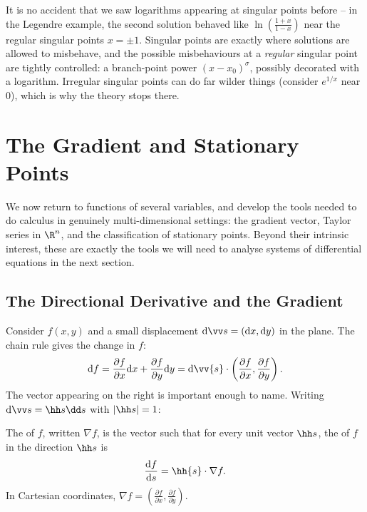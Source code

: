 \begin{remark}
	It is no accident that we saw logarithms appearing at singular points before -- in the Legendre example, the second solution behaved like $\ln\left(\frac{1+x}{1-x}\right)$ near the regular singular points $x = \pm 1$. Singular points are exactly where solutions are allowed to misbehave, and the possible misbehaviours at a \emph{regular} singular point are tightly controlled: a branch-point power $(x - x_0)^\sigma$, possibly decorated with a logarithm. Irregular singular points can do far wilder things (consider $e^{1/x}$ near $0$), which is why the theory stops there.
\end{remark}

\section{The Gradient and Stationary Points}

We now return to functions of several variables, and develop the tools needed to do calculus in genuinely multi-dimensional settings: the gradient vector, Taylor series in $\R^n$, and the classification of stationary points. Beyond their intrinsic interest, these are exactly the tools we will need to analyse systems of differential equations in the next section.

\subsection{The Directional Derivative and the Gradient}

Consider $f(x, y)$ and a small displacement $\mathrm{d}\vv s = (\mathrm{d}x, \mathrm{d}y)$ in the plane. The chain rule gives the change in $f$:
$$
\mathrm{d}f = \frac{\partial f}{\partial x}\mathrm{d}x + \frac{\partial f}{\partial y}\mathrm{d}y = \mathrm{d}\vv{s} \cdot \left(\frac{\partial f}{\partial x}, \frac{\partial f}{\partial y}\right).
$$
The vector appearing on the right is important enough to name. Writing $\mathrm{d}\vv s = \hh s \dd s$ with $|\hh s| = 1$:

\begin{definition}
	The  of $f$, written $\nabla f$, is the vector such that for every unit vector $\hh s$, the  of $f$ in the direction $\hh s$ is
	$$
	\frac{\mathrm{d}f}{\mathrm{d}s} = \hh{s} \cdot \nabla f.
	$$
	In Cartesian coordinates, $\nabla f = \left(\frac{\partial f}{\partial x}, \frac{\partial f}{\partial y}\right)$.
\end{definition}

